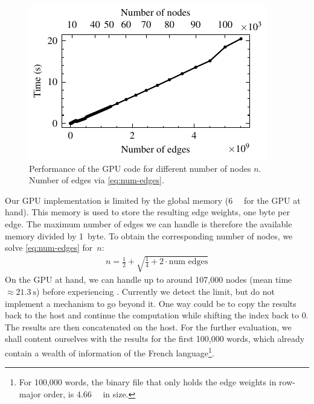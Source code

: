 \begin{figure}[H]
    \centering
    \includegraphics[width=0.95\linewidth]{assets/timing.pdf}
    \caption{Performance of the GPU code for different number of nodes $n$. Number of edges via \eqref{eq:num-edges}.}
    \label{fig:timing}
\end{figure}

\vspace{-0.5cm}

Our GPU implementation is limited by the global memory (\qty{6}{\giga\byte} for the GPU at hand). This memory is used to store the resulting edge weights, \ie one byte per edge. The maximum number of edges we can handle is therefore the available memory divided by 1~byte. To obtain the corresponding number of nodes, we solve \eqref{eq:num-edges} for~$n$:
\begin{align}
    n = \frac{1}{2} + \sqrt{\frac{1}{4} + 2 \cdot \text{num edges}}
\end{align}
On the GPU at hand, we can handle up to around 107,000 nodes (mean time $\approx \qty{21.3}{\s}$) before experiencing . Currently we detect the limit, but do not implement a mechanism to go beyond it. One way could be to copy the results back to the host and continue the computation while shifting the index back to $0$. The results are then concatenated on the host. For the further evaluation, we shall content ourselves with the results for the first 100,000 words, which already contain a wealth of information of the French language\footnote{For 100,000 words, the binary file that only holds the edge weights in row-major order, is \qty{4.66}{\giga\byte} in size.}.

